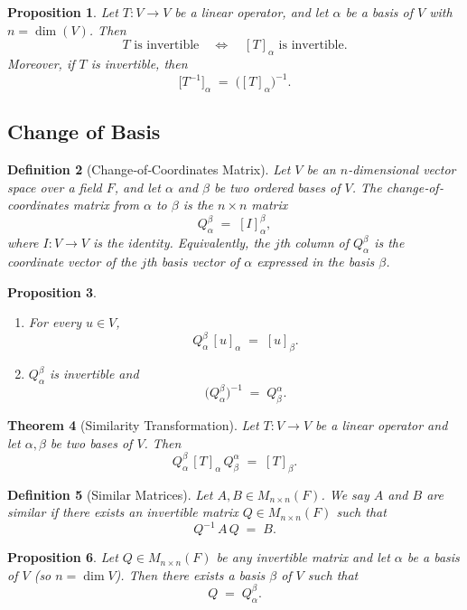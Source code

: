 \documentclass[12pt]{article}
\theoremstyle{break}             %
\newtheorem{thm}{Theorem}          %
\newtheorem{prop}[thm]{Proposition}%
\newtheorem{defn}[thm]{Definition}
\begin{document}
\begin{prop}
Let \(T: V \to V\) be a linear operator, and let \(\alpha\) be a basis of \(V\) with \(n = \dim(V)\).  Then
\[
T\text{ is invertible}
\quad\Longleftrightarrow\quad
[T]_{\alpha}\text{ is invertible}.
\]
Moreover, if \(T\) is invertible, then
\[
\bigl[T^{-1}\bigr]_{\alpha}
\;=\;
\bigl([T]_{\alpha}\bigr)^{-1}.
\]
\end{prop}

\subsection{Change of Basis}

\begin{defn}[Change‐of‐Coordinates Matrix]
Let \(V\) be an \(n\)-dimensional vector space over a field \(F\), and let 
\(\alpha\) and \(\beta\) be two ordered bases of \(V\).  The \emph{change‐of‐coordinates matrix from \(\alpha\) to \(\beta\)} is the \(n\times n\) matrix
\[
Q^\beta_\alpha \;=\; [I]^{\beta}_{\alpha},
\]
where \(I:V\to V\) is the identity.  Equivalently, the \(j\)th column of \(Q^\beta_\alpha\) is the coordinate vector of the \(j\)th basis vector of \(\alpha\) expressed in the basis \(\beta\).
\end{defn}

\begin{prop}\leavevmode\vspace{-20.5pt}
\begin{enumerate}
\item For every $u\in V$,
\[
Q^\beta_\alpha\,[u]_\alpha \;=\; [u]_\beta.
\]
\item $Q^\beta_\alpha$ is invertible and 
\[
\bigl(Q^\beta_\alpha\bigr)^{-1} \;=\; Q^\alpha_\beta.
\]
\end{enumerate}
\end{prop}

\begin{thm}[Similarity Transformation]
Let $T:V\to V$ be a linear operator and let $\alpha,\beta$ be two bases of $V$.  Then
\[
Q^\beta_\alpha \,[T]_\alpha \,Q^\alpha_\beta \;=\; [T]_\beta.
\]
\end{thm}

\begin{defn}[Similar Matrices]
Let \(A,B\in M_{n\times n}(F)\).  We say \(A\) and \(B\) are \emph{similar} if there exists an invertible matrix \(Q\in M_{n\times n}(F)\) such that
\[
Q^{-1} \,A\,Q \;=\; B.
\]
\end{defn}

\begin{prop}
Let $Q\in M_{n\times n}(F)$ be any invertible matrix and let $\alpha$ be a basis of $V$ (so $n=\dim V$).  Then there exists a basis $\beta$ of $V$ such that
\[
Q \;=\; Q^\beta_\alpha.
\]
\end{prop}
\end{document}
